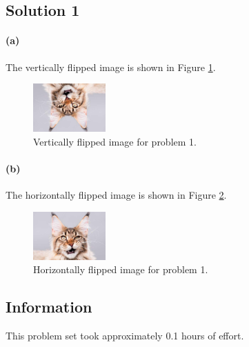 \documentclass{article}
\newcommand{\info}{\clearpage \subsection*{Information}}
\newcommand{\solution}[1]{\clearpage \subsection*{Solution #1}}
\newcommand{\spart}[1]{\paragraph{(#1)}}
\begin{document}

\solution{1} 

\spart{a} The vertically flipped image is shown in Figure \ref{fig:vert}.

\begin{figure}[!h]
  \centering
  \includegraphics[height=5em]{./code/outputs/flipy.jpg}
  \caption{Vertically flipped image for problem 1.}
  \label{fig:vert}
\end{figure}

\spart{b} The horizontally flipped image is shown in Figure \ref{fig:horiz}.

\begin{figure}[!h]
  \centering
  \includegraphics[height=5em]{./code/outputs/flipx.jpg}
  \caption{Horizontally flipped image for problem 1.}
  \label{fig:horiz}
\end{figure}

\info

This problem set took approximately 0.1 hours of effort.


\end{document}
